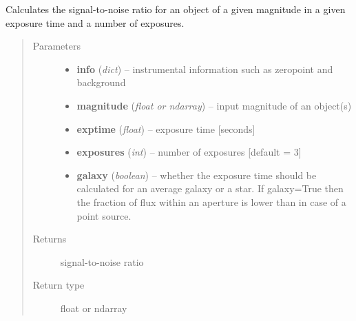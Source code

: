 \documentclass[a4paper,12pt,english]{sphinxmanual}
\begin{document}
\begin{fulllineitems}
\label{analysis:analysis.ETC.SNR}
Calculates the signal-to-noise ratio for an object of a given magnitude in a given exposure time and a
number of exposures.
\begin{quote}\begin{description}
\item[{Parameters}] \leavevmode\begin{itemize}
\item {} 
\textbf{info} (\emph{dict}) -- instrumental information such as zeropoint and background

\item {} 
\textbf{magnitude} (\emph{float or ndarray}) -- input magnitude of an object(s)

\item {} 
\textbf{exptime} (\emph{float}) -- exposure time {[}seconds{]}

\item {} 
\textbf{exposures} (\emph{int}) -- number of exposures {[}default = 3{]}

\item {} 
\textbf{galaxy} (\emph{boolean}) -- whether the exposure time should be calculated for an average galaxy or a star.
If galaxy=True then the fraction of flux within an aperture is lower than in case of a point source.

\end{itemize}

\item[{Returns}] \leavevmode
signal-to-noise ratio

\item[{Return type}] \leavevmode
float or ndarray

\end{description}\end{quote}

\end{fulllineitems}

\end{document}
